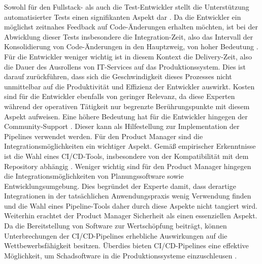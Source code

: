 \vspace*{-15mm}
Sowohl für den Fullstack- als auch die Test-Entwickler stellt die Unterstützung automatisierter Tests einen signifikanten Aspekt dar \cite[Z. 5 ff.]{BackendTestDeveloperSAPDTSIntegration.}. Da die Entwickler ein möglichst zeitnahes Feedback auf Code-Änderungen erhalten möchten, ist bei der Abwicklung dieser Tests insbesondere die Integration-Zeit, also das Intervall der Konsolidierung von Code-Änderungen in den Hauptzweig, von hoher Bedeutung \cite[Z. 23 ff.]{TestDeveloperSAPHyperspaceAdoption&Onboarding.b}. Für die Entwickler weniger wichtig ist in diesem Kontext die Delivery-Zeit, also die Dauer des Ausrollens von IT-Services auf das Produktionssystem. Dies ist darauf zurückführen, dass sich die Geschwindigkeit dieses Prozesses nicht unmittelbar auf die Produktivität  und Effizienz der Entwickler auswirkt. Kosten sind für die Entwickler ebenfalls von geringer Relevanz, da diese Experten während der operativen Tätigkeit nur begrenzte Berührungspunkte mit diesem Aspekt aufweisen. Eine höhere Bedeutung hat für die Entwickler hingegen der Community-Support \cite[Z. 25 ff.]{FullStackEntwicklerSAPDTSIntegration.}. Dieser kann als Hilfestellung zur Implementation der Pipelines verwendet werden. Für den Product Manager sind die Integrationsmöglichkeiten ein wichtiger Aspekt. Gemäß empirischer Erkenntnisse ist die Wahl eines CI/CD-Tools, insbesondere von der Kompatibilität mit dem Repository abhängig \cite[Z. 5 ff.]{exp8}. Weniger wichtig sind für den Product Manager hingegen die Integrationsmöglichkeiten von Planungssoftware sowie Entwicklungsumgebung. Dies begründet der Experte damit, dass derartige Integrationen in der tatsächlichen Anwendungspraxis wenig Verwendung finden und die Wahl eines Pipeline-Tools daher durch diese Aspekte nicht tangiert wird. Weiterhin erachtet der Product Manager Sicherheit als einen essenziellen Aspekt. Da die Bereitstellung von Software zur Wertschöpfung beiträgt, können Unterbrechungen der CI/CD-Pipelines erhebliche Auswirkungen auf die Wettbewerbsfähigkeit besitzen. Überdies bieten CI/CD-Pipelines eine effektive Möglichkeit, um Schadsoftware in die Produktionssysteme einzuschleusen \cite[Z. 5 ff.]{exp8}. 


